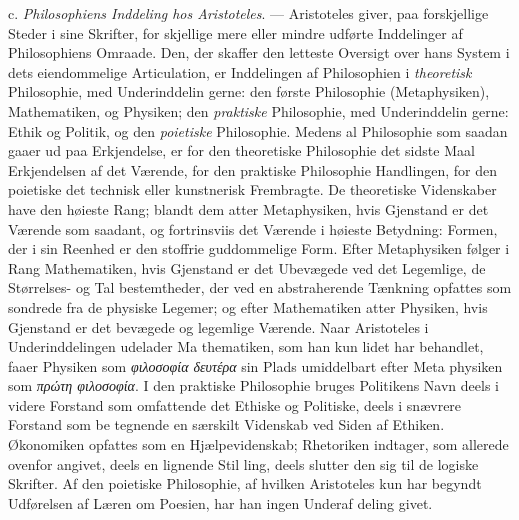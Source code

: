 \documentclass[12pt,a4paper]{book}
\newcommand{\gk}[1]{\textit{#1}}
\begin{document}
c. \emph{Philosophiens Inddeling hos Aristoteles}. ---
Aristoteles giver, paa forskjellige Steder i sine Skrifter, for\-%
skjellige mere eller mindre udførte Inddelinger af Philosophiens
Omraade. Den, der skaffer den letteste Oversigt over hans
System i dets eiendommelige Articulation, er Inddelingen af
Philosophien i \emph{theoretisk} Philosophie, med Underinddelin\-%
gerne: den første Philosophie (Metaphysiken), Mathematiken,
og Physiken; den \emph{praktiske} Philosophie, med Underinddelin\-%
gerne: Ethik og Politik, og den \emph{poietiske} Philosophie.
Medens al Philosophie som saadan gaaer ud paa Erkjendelse,
er for den theoretiske Philosophie det sidste Maal Erkjendelsen
af det Værende, for den praktiske Philosophie Handlingen, for
den poietiske det technisk eller kunstnerisk Frembragte. De
theoretiske Videnskaber have den høieste Rang; blandt dem atter
Metaphysiken, hvis Gjenstand er det Værende som saadant,
og fortrinsviis det Værende i høieste Betydning: Formen, der
i sin Reenhed er den stoffrie guddommelige Form. Efter
Metaphysiken følger i Rang Mathematiken, hvis Gjenstand er
det Ubevægede ved det Legemlige, de Størrelses- og Tal\-%
bestemtheder, der ved en abstraherende Tænkning opfattes som
sondrede fra de physiske Legemer; og efter Mathematiken
atter Physiken, hvis Gjenstand er det bevægede og legemlige
Værende. Naar Aristoteles i Underinddelingen udelader Ma\-%
thematiken, som han kun lidet har behandlet, faaer Physiken
som \gk{φιλοσοφία δευτέρα} sin Plads umiddelbart efter Meta\-%
physiken som \gk{πρώτη φιλοσοφία}. I den praktiske Philosophie
bruges Politikens Navn deels i videre Forstand som omfattende
det Ethiske og Politiske, deels i snævrere Forstand som be\-%
tegnende en særskilt Videnskab ved Siden af Ethiken.
Økonomiken opfattes som en Hjælpevidenskab; Rhetoriken
indtager, som allerede ovenfor angivet, deels en lignende Stil\-%
ling, deels slutter den sig til de logiske Skrifter. Af den
poietiske Philosophie, af hvilken Aristoteles kun har begyndt
Udførelsen af Læren om Poesien, har han ingen Underaf\-%
deling givet.
\end{document}
